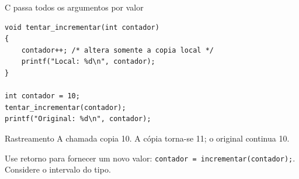 \begin{frame}[fragile]{C passa todos os argumentos por valor}
\begin{lstlisting}
void tentar_incrementar(int contador)
{
    contador++; /* altera somente a copia local */
    printf("Local: %d\n", contador);
}

int contador = 10;
tentar_incrementar(contador);
printf("Original: %d\n", contador);
\end{lstlisting}
\begin{block}{Rastreamento}
A chamada copia 10. A cópia torna-se 11; o original continua 10.
\end{block}
\small Use retorno para fornecer um novo valor: \texttt{contador = incrementar(contador);}. Considere o intervalo do tipo.
\end{frame}
